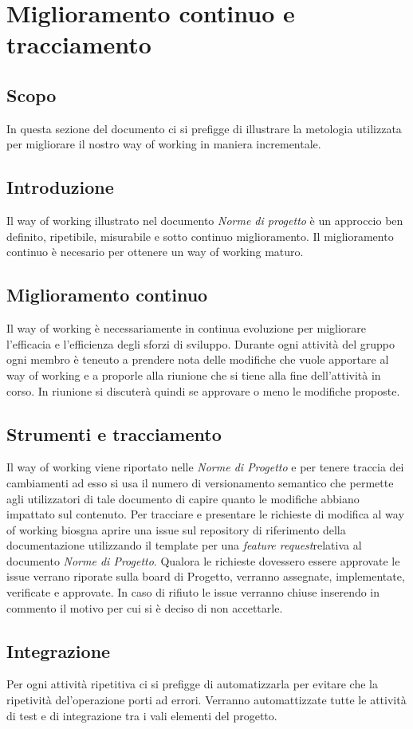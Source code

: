 \section{Miglioramento continuo e tracciamento}

\subsection{Scopo}
In questa sezione del documento ci si prefigge di illustrare la metologia utilizzata
per migliorare il nostro way of working in maniera incrementale.

\subsection{Introduzione}
Il way of working illustrato nel documento \textit{Norme di progetto} è un approccio
ben definito, ripetibile, misurabile e sotto continuo miglioramento.
Il miglioramento continuo è necesario per ottenere un way of working maturo.

\subsection{Miglioramento continuo}
Il way of working è necessariamente in continua evoluzione per migliorare l'efficacia
e l'efficienza degli sforzi di sviluppo.
Durante ogni attività del gruppo ogni membro è teneuto a prendere nota delle modifiche
che vuole apportare al way of working e a proporle alla riunione che si tiene alla
fine dell'attività in corso.
In riunione si discuterà quindi se approvare o meno le modifiche proposte.
\subsection{Strumenti e tracciamento}
Il way of working viene riportato nelle \textit{Norme di Progetto}%
e per tenere traccia dei cambiamenti ad esso si usa il numero di versionamento semantico
che permette agli utilizzatori di tale documento di capire quanto le modifiche abbiano
impattato sul contenuto.
Per tracciare e presentare le richieste di modifica al way of working biosgna aprire
una issue sul repository di riferimento della documentazione utilizzando il template
per una \textit{feature request}\glo relativa al documento \textit{Norme di Progetto}.
Qualora le richieste dovessero essere approvate le issue verrano riporate sulla
board di Progetto, verranno assegnate, implementate, verificate e approvate.
In caso di rifiuto le issue verranno chiuse inserendo in commento il motivo per cui
si è deciso di non accettarle.

\subsection{Integrazione}
Per ogni attività ripetitiva ci si prefigge di automatizzarla per evitare che la
ripetività del'operazione porti ad errori.
Verranno automattizzate tutte le attività di test e di integrazione tra i vali
elementi del progetto.
